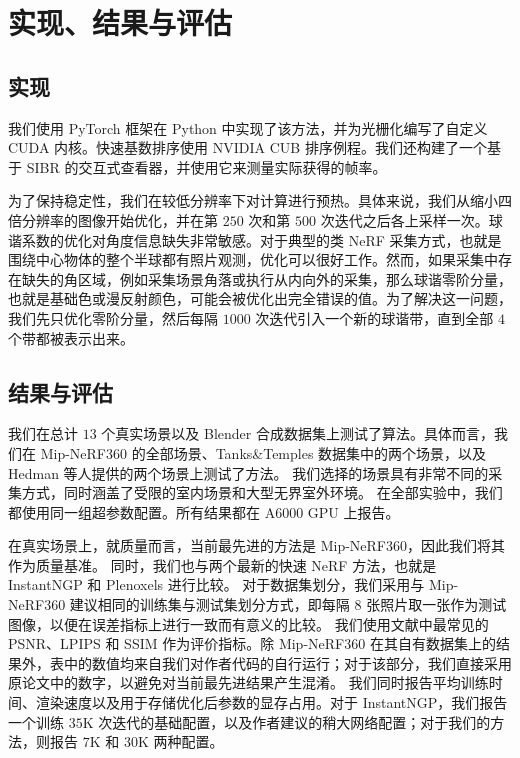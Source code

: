\section{实现、结果与评估}

\subsection{实现}

我们使用 PyTorch 框架在 Python 中实现了该方法，并为光栅化编写了自定义 CUDA 内核。快速基数排序使用 NVIDIA CUB 排序例程。我们还构建了一个基于 SIBR 的交互式查看器，并使用它来测量实际获得的帧率。

为了保持稳定性，我们在较低分辨率下对计算进行预热。具体来说，我们从缩小四倍分辨率的图像开始优化，并在第 \(250\) 次和第 \(500\) 次迭代之后各上采样一次。球谐系数的优化对角度信息缺失非常敏感。对于典型的类 NeRF 采集方式，也就是围绕中心物体的整个半球都有照片观测，优化可以很好工作。然而，如果采集中存在缺失的角区域，例如采集场景角落或执行从内向外的采集，那么球谐零阶分量，也就是基础色或漫反射颜色，可能会被优化出完全错误的值。为了解决这一问题，我们先只优化零阶分量，然后每隔 \(1000\) 次迭代引入一个新的球谐带，直到全部 \(4\) 个带都被表示出来。

\subsection{结果与评估}

我们在总计 \(13\) 个真实场景以及 Blender 合成数据集上测试了算法。具体而言，我们在 Mip-NeRF360 的全部场景、Tanks\&Temples 数据集中的两个场景，以及 Hedman 等人提供的两个场景上测试了方法。
我们选择的场景具有非常不同的采集方式，同时涵盖了受限的室内场景和大型无界室外环境。
在全部实验中，我们都使用同一组超参数配置。所有结果都在 A6000 GPU 上报告。

在真实场景上，就质量而言，当前最先进的方法是 Mip-NeRF360，因此我们将其作为质量基准。
同时，我们也与两个最新的快速 NeRF 方法，也就是 InstantNGP 和 Plenoxels 进行比较。
对于数据集划分，我们采用与 Mip-NeRF360 建议相同的训练集与测试集划分方式，即每隔 \(8\) 张照片取一张作为测试图像，以便在误差指标上进行一致而有意义的比较。
我们使用文献中最常见的 PSNR、LPIPS 和 SSIM 作为评价指标。除 Mip-NeRF360 在其自有数据集上的结果外，表中的数值均来自我们对作者代码的自行运行；对于该部分，我们直接采用原论文中的数字，以避免对当前最先进结果产生混淆。
我们同时报告平均训练时间、渲染速度以及用于存储优化后参数的显存占用。对于 InstantNGP，我们报告一个训练 \(35\mathrm{K}\) 次迭代的基础配置，以及作者建议的稍大网络配置；对于我们的方法，则报告 \(7\mathrm{K}\) 和 \(30\mathrm{K}\) 两种配置。


